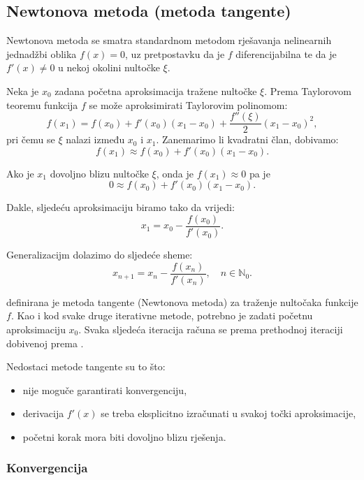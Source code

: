 \subsection{Newtonova metoda (metoda tangente)}

Newtonova metoda se smatra standardnom metodom rješavanja nelinearnih jednadžbi
oblika $f(x)=0$, uz pretpostavku da je $f$ diferencijabilna te da je $f'(x) \neq
0$ u nekoj okolini nultočke $\xi$.

Neka je $x_0$ zadana početna aproksimacija tražene nultočke $\xi$. Prema
Taylorovom teoremu funkcija $f$ se može aproksimirati Taylorovim polinomom:
$$
f(x_1) = f(x_0) + f'(x_0)(x_1-x_0)+\dfrac{f''(\xi)}{2}(x_1-x_0)^2,
$$
pri čemu se $\xi$ nalazi između $x_0$ i $x_1$. Zanemarimo li kvadratni član,
dobivamo:
$$
f(x_1) \approx f(x_0) + f'(x_0)(x_1-x_0).
$$

Ako je $x_1$ dovoljno blizu nultočke $\xi$, onda je $f(x_1)\approx 0$ pa je
$$
0 \approx f(x_0) + f'(x_0)(x_1-x_0).
$$

Dakle, sljedeću aproksimaciju biramo tako da vrijedi:
$$
x_1 = x_0 - \dfrac{f(x_0)}{f'(x_0)}.
$$


Generalizacijm dolazimo do sljedeće sheme:
\begin{equation}
    \label{eq:metoda_tangente}
    x_{n+1} = x_n - \dfrac{f(x_n)}{f'(x_n)},\quad n \in \mathbb{N}_0.
\end{equation}

 definirana je metoda tangente (Newtonova
metoda) za traženje nultočaka funkcije $f$. Kao i kod svake druge iterativne
metode, potrebno je zadati početnu aproksimaciju $x_0$. Svaka sljedeća iteracija
računa se prema prethodnoj iteraciji dobivenoj prema
.

Nedostaci metode tangente su to što:
\begin{itemize}
    \item nije moguče garantirati konvergenciju,
    \item derivacija $f'(x)$ se treba eksplicitno izračunati u svakoj točki
    aproksimacije,
    \item početni korak mora biti dovoljno blizu rješenja.
\end{itemize}


\subsubsection{Konvergencija}


